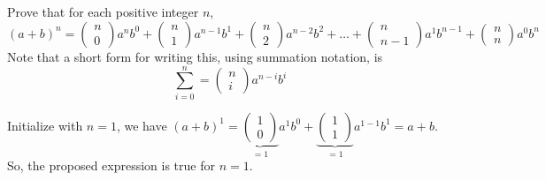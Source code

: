 \subsection{}
\begin{tcolorbox}
Prove that for each positive integer $n$, 
$$(a + b)^n =\left(\begin{matrix}n\\ 0\end{matrix}\right)a^{n}b^{0}+\left(\begin{matrix}n\\ 1\end{matrix}\right)a^{n-1}b^{1}+\left(\begin{matrix}n\\ 2\end{matrix}\right)a^{n-2}b^{2}+\dots +\left(\begin{matrix}n\\n-1\end{matrix}\right)a^{1}b^{n-1}+\left(\begin{matrix}n\\ n\end{matrix}\right)a^{0}b^{n}$$ Note  that a short form for writing this, using summation notation, is $$\sum^n_{i=0} = \left(\begin{matrix}n\\ i\end{matrix}\right)a^{n-i}b^i$$
\end{tcolorbox}
$$ $$
Initialize with $n=1$, we have
$(a + b)^1=  \underbrace{\left(\begin{matrix}1\\ 0\end{matrix}\right)}_{=1}a^{1}b^{0}+\underbrace{\left(\begin{matrix}1\\ 1\end{matrix}\right)}_{=1}a^{1-1}b^{1}=a+b$. So, the proposed expression is true for $n=1$. \\

